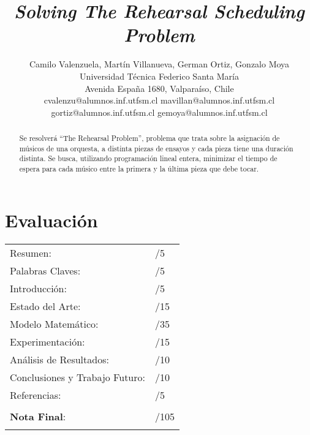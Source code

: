\documentclass[journal, 10pt]{IEEEtran}
\begin{document}
\title{\textit{Solving The Rehearsal Scheduling Problem}}
\author{Camilo Valenzuela, Martín Villanueva, German Ortiz, Gonzalo Moya \\ Universidad Técnica Federico Santa María \\
Avenida España 1680, Valparaíso, Chile \\
cvalenzu@alumnos.inf.utfsm.cl mavillan@alumnos.inf.utfsm.cl gortiz@alumnos.inf.utfsm.cl gemoya@alumnos.inf.utfsm.cl}
\maketitle

\section*{Evaluación}

\begin{tabular}{ll}
Resumen: & \underline{\hspace{0.5cm}}/5 \\
Palabras Claves: & \underline{\hspace{0.5cm}}/5 \\
Introducción: & \underline{\hspace{0.5cm}}/5 \\
Estado del Arte:  & \underline{\hspace{0.5cm}}/15 \\
Modelo Matemático: &  \underline{\hspace{0.5cm}}/35 \\
Experimentación: &  \underline{\hspace{0.5cm}}/15 \\
Análisis de Resultados: &  \underline{\hspace{0.5cm}}/10 \\
Conclusiones y Trabajo Futuro: &  \underline{\hspace{0.5cm}}/10 \\
Referencias: & \underline{\hspace{0.5cm}}/5 \\
 &  \\
\textbf{Nota Final}:   & \underline{\hspace{0.5cm}}/105 \\
&  \\
\end{tabular}

\begin{abstract}
\boldmath Se resolverá ``The Rehearsal Problem'', problema que trata sobre la asignación de músicos de una orquesta, a distinta piezas de ensayos y cada pieza tiene una duración distinta. Se busca, utilizando programación lineal entera, minimizar el tiempo de espera para cada músico entre la primera y la última pieza que debe tocar.
\end{abstract}
\end{document}
